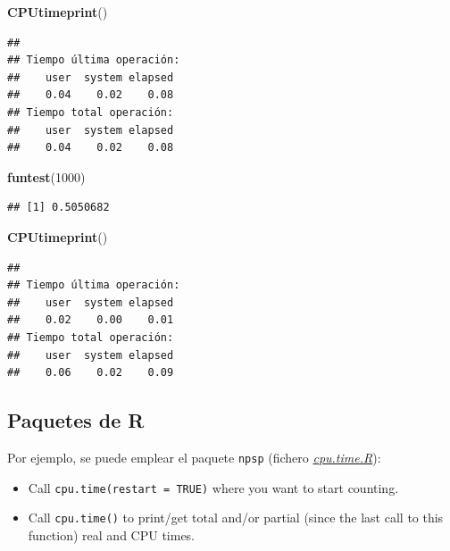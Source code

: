 \documentclass[
]{book}
\newenvironment{Shaded}{\begin{snugshade}}{\end{snugshade}}
\newcommand{\DecValTok}[1]{\textcolor[rgb]{0.00,0.00,0.81}{#1}}
\newcommand{\KeywordTok}[1]{\textcolor[rgb]{0.13,0.29,0.53}{\textbf{#1}}}
\newcommand{\NormalTok}[1]{#1}
\theoremstyle{break}
\theoremstyle{definition}
\theoremstyle{definition}
\theoremstyle{definition}
\theoremstyle{remark}
\begin{document}
\begin{Shaded}
\begin{Highlighting}[]
\KeywordTok{CPUtimeprint}\NormalTok{()}
\end{Highlighting}
\end{Shaded}

\begin{verbatim}
## 
## Tiempo última operación:
##    user  system elapsed 
##    0.04    0.02    0.08 
## Tiempo total operación:
##    user  system elapsed 
##    0.04    0.02    0.08
\end{verbatim}

\begin{Shaded}
\begin{Highlighting}[]
\KeywordTok{funtest}\NormalTok{(}\DecValTok{1000}\NormalTok{)}
\end{Highlighting}
\end{Shaded}

\begin{verbatim}
## [1] 0.5050682
\end{verbatim}

\begin{Shaded}
\begin{Highlighting}[]
\KeywordTok{CPUtimeprint}\NormalTok{()}
\end{Highlighting}
\end{Shaded}

\begin{verbatim}
## 
## Tiempo última operación:
##    user  system elapsed 
##    0.02    0.00    0.01 
## Tiempo total operación:
##    user  system elapsed 
##    0.06    0.02    0.09
\end{verbatim}

\hypertarget{paquetes-de-r-1}{%
\subsection{Paquetes de R}\label{paquetes-de-r-1}}

Por ejemplo, se puede emplear el paquete \texttt{npsp} (fichero \emph{\href{https://github.com/rubenfcasal/npsp/blob/master/R/cpu.time.R}{cpu.time.R}}):

\begin{itemize}
\item
  Call \texttt{cpu.time(restart\ =\ TRUE)} where you want to start counting.
\item
  Call \texttt{cpu.time()} to print/get total and/or partial (since the last call
  to this function) real and CPU times.
\end{itemize}
\end{document}
